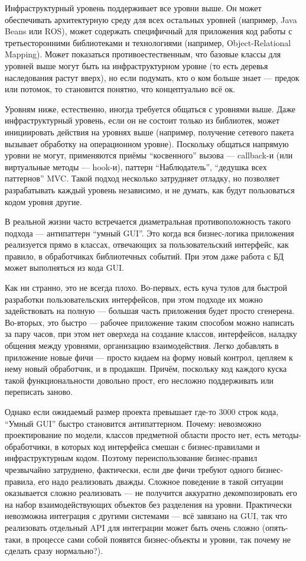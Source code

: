 \documentclass[a5paper]{article}
\begin{document}
Инфраструктурный уровень поддерживает все уровни выше. Он может обеспечивать архитектурную среду для всех остальных уровней (например, Java Beans или ROS), может содержать специфичный для приложения код работы с третьесторонними библиотеками и технологиями (например, Object-Relational Mapping). Может показаться противоестественным, что базовые классы для уровней выше могут быть на инфраструктурном уровне (то есть деревья наследования растут вверх), но если подумать, кто о ком больше знает --- предок или потомок, то становится понятно, что концептуально всё ок.

Уровням ниже, естественно, иногда требуется общаться с уровнями выше. Даже инфраструктурный уровень, если он не состоит только из библиотек, может инициировать действия на уровнях выше (например, получение сетевого пакета вызывает обработку на операционном уровне). Поскольку общаться напрямую уровни не могут, применяются приёмы ``косвенного'' вызова --- callback-и (или виртуальные методы --- hook-и), паттерн ``Наблюдатель'', ``дедушка всех паттернов'' MVC. Такой подход несколько затрудняет отладку, но позволяет разрабатывать каждый уровень независимо, и не думать, как будут пользоваться кодом уровня другие.

В реальной жизни часто встречается диаметральная противоположность такого подхода --- антипаттерн ``умный GUI''. Это когда вся бизнес-логика приложения реализуется прямо в классах, отвечающих за пользовательский интерфейс, как правило, в обработчиках библиотечных событий. При этом даже работа с БД может выполняться из кода GUI.

Как ни странно, это не всегда плохо. Во-первых, есть куча тулов для быстрой разработки пользовательских интерфейсов, при этом подходе их можно задействовать на полную --- большая часть приложения будет просто сгенерена. Во-вторых, это быстро --- рабочее приложение таким способом можно написать за пару часов, при этом нет оверхеда на создание классов, интерфейсов, наладку общения между уровнями, организацию взаимодействия. Легко добавлять в приложение новые фичи --- просто кидаем на форму новый контрол, цепляем к нему новый обработчик, и в продакшн. Причём, поскольку код каждого куска такой функциональности довольно прост, его несложно поддерживать или переписать заново.

Однако если ожидаемый размер проекта превышает где-то 3000 строк кода, ``Умный GUI'' быстро становится антипаттерном. Почему: невозможно проектирование по модели, классов предметной области просто нет, есть методы-обработчики, в которых код интерфейса смешан с бизнес-правилами и инфраструктурным кодом. Поэтому переиспользование бизнес-правил чрезвычайно затруднено, фактически, если две фичи требуют одного бизнес-правила, его надо реализовать дважды. Сложное поведение в такой ситуации оказывается сложно реализовать --- не получится аккуратно декомпозировать его на набор взаимодействующих объектов без разделения на уровни. Практически невозможна интеграция с другими системами --- всё завязано на GUI, так что реализовать отдельный API для интеграции может быть очень сложно (опять-таки, в процессе сами собой появятся бизнес-объекты и уровни, так почему не сделать сразу нормально?).
\end{document}
